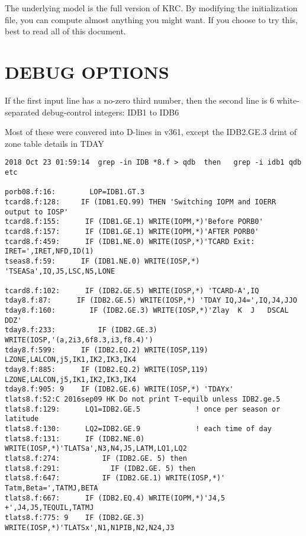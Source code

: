\documentclass{article}
\begin{document}
The underlying model is the full version of KRC. By modifying the initialization
file, you can compute almost anything you might want. If you choose to try this,
best to read all of this document.

\section{ DEBUG OPTIONS \label{debug}}
If the first input line has a no-zero third number, then the second line is 6 
white-separated debug-control integers: IDB1 to IDB6

Most of these were convered into D-lines in v361, except the IDB2.GE.3 drint of zone table details in TDAY

\vspace{-3.mm} 
\begin{verbatim}
2018 Oct 23 01:59:14  grep -in IDB *8.f > qdb  then   grep -i idb1 qdb  etc

porb08.f:16:        LOP=IDB1.GT.3
tcard8.f:128:     IF (IDB1.EQ.99) THEN 'Switching IOPM and IOERR output to IOSP'
tcard8.f:155:      IF (IDB1.GE.1) WRITE(IOPM,*)'Before PORB0'
tcard8.f:157:      IF (IDB1.GE.1) WRITE(IOPM,*)'AFTER PORB0'
tcard8.f:459:      IF (IDB1.NE.0) WRITE(IOSP,*)'TCARD Exit: IRET=',IRET,NFD,ID(1)
tseas8.f:59:      IF (IDB1.NE.0) WRITE(IOSP,*) 'TSEASa',IQ,J5,LSC,N5,LONE

tcard8.f:102:      IF (IDB2.GE.5) WRITE(IOSP,*) 'TCARD-A',IQ
tday8.f:87:      IF (IDB2.GE.5) WRITE(IOSP,*) 'TDAY IQ,J4=',IQ,J4,JJO
tday8.f:160:        IF (IDB2.GE.3) WRITE(IOSP,*)'Zlay  K  J   DSCAL     DDZ'
tday8.f:233:          IF (IDB2.GE.3) WRITE(IOSP,'(a,2i3,6f8.3,i3,f8.4)')  
tday8.f:599:      IF (IDB2.EQ.2) WRITE(IOSP,119) LZONE,LALCON,j5,IK1,IK2,IK3,IK4
tday8.f:885:      IF (IDB2.EQ.2) WRITE(IOSP,119) LZONE,LALCON,j5,IK1,IK2,IK3,IK4
tday8.f:905: 9    IF (IDB2.GE.6) WRITE(IOSP,*) 'TDAYx'
tlats8.f:52:C 2016sep09 HK Do not print T-equilb unless IDB2.ge.5
tlats8.f:129:      LQ1=IDB2.GE.5             ! once per season or latitude
tlats8.f:130:      LQ2=IDB2.GE.9             ! each time of day
tlats8.f:131:      IF (IDB2.NE.0) WRITE(IOSP,*)'TLATSa',N3,N4,J5,LATM,LQ1,LQ2
tlats8.f:274:          IF (IDB2.GE. 5) then
tlats8.f:291:            IF (IDB2.GE. 5) then
tlats8.f:647:          IF (IDB2.GE.1) WRITE(IOSP,*)' Tatm,Beta=',TATMJ,BETA
tlats8.f:667:      IF (IDB2.EQ.4) WRITE(IOPM,*)'J4,5 +',J4,J5,TEQUIL,TATMJ
tlats8.f:775: 9    IF (IDB2.GE.3) WRITE(IOSP,*)'TLATSx',N1,N1PIB,N2,N24,J3


\end{verbatim}
\end{document}
